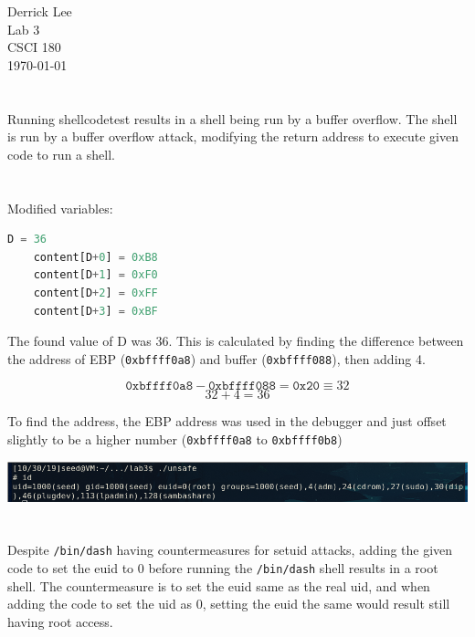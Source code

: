 \documentclass[12pt]{exam}
\begin{document}
\noindent
Derrick Lee\\
Lab 3\\
CSCI 180\\
\today\\

\section{}

Running shellcodetest results in a shell being run by a buffer overflow.  The
shell is run by a buffer overflow attack, modifying the return address to
execute given code to run a shell.

\section{}

Modified variables:

\begin{lstlisting}[language=python]
    D = 36
    content[D+0] = 0xB8
    content[D+1] = 0xF0
    content[D+2] = 0xFF
    content[D+3] = 0xBF
\end{lstlisting}

The found value of D was 36.  This is calculated by finding the difference
between the address of EBP (\lstinline{0xbffff0a8}) and buffer
(\lstinline{0xbffff088}), then adding 4. 

$$\mathtt{0xbffff0a8} - \mathtt{0xbffff088} = \mathtt{0x20} \equiv 32$$
$$32 + 4 = 36$$

To find the address, the EBP address
was used in the debugger and just offset slightly to be a higher number
(\lstinline{0xbffff0a8} to \lstinline{0xbffff0b8})

\vspace*{.2in}
\noindent
\includegraphics[width=\textwidth]{q2}

\section{}

Despite \lstinline{/bin/dash} having countermeasures for setuid attacks, adding
the given code to set the euid to 0 before running the \lstinline{/bin/dash}
shell results in a root shell.  The countermeasure is to set the euid same as
the real uid, and when adding the code to set the uid as 0, setting the euid the
same would result still having root access.
\end{document}
